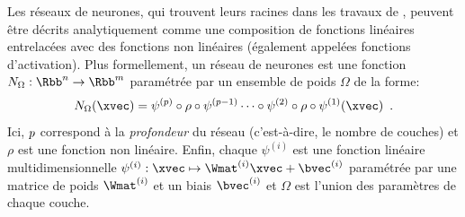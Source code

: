 Les réseaux de neurones, qui trouvent leurs racines dans les travaux de \citet{mcculloch1943logical,rosenblatt1958perceptron}, peuvent être décrits analytiquement comme une composition de fonctions linéaires entrelacées avec des fonctions non linéaires (également appelées fonctions d'activation).
Plus formellement, un réseau de neurones est une fonction $N_{\Omega} : \Rbb^n \rightarrow \Rbb^m$ paramétrée par un ensemble de poids $\Omega$ de la forme:
\begin{equation} \label{equation:ap7-neural_network}
  N_{\Omega}(\xvec) = \psi^{(\depth)} \circ \rho \circ \psi^{(\depth-1)} \cdots \circ \psi^{(2)} \circ \rho \circ \psi^{(1)} (\xvec) \enspace.
\end{equation}
Ici, $p$ correspond à la \emph{profondeur} du réseau (c'est-à-dire, le nombre de couches) et $\rho$ est une fonction non linéaire.
Enfin, chaque $\psi^{(i)}$ est une fonction linéaire multidimensionnelle $\psi^{(i)} : \xvec \mapsto \Wmat^{(i)} \xvec + \bvec^{(i)}$ paramétrée par une matrice de poids $\Wmat^{(i)}$ et un biais $\bvec^{(i)}$ et $\Omega$ est l'union des paramètres de chaque couche. 



